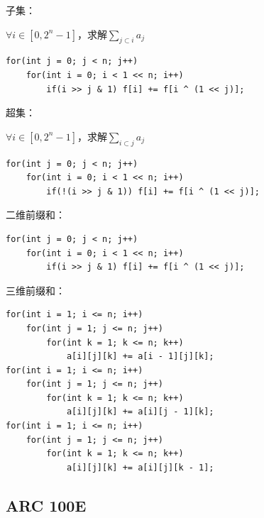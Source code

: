 子集：\par
$\forall i \in [0, 2^n - 1]$，求解$\sum\limits_{j \subset i} a_j$\par
\begin{lstlisting}
for(int j = 0; j < n; j++) 
    for(int i = 0; i < 1 << n; i++)
        if(i >> j & 1) f[i] += f[i ^ (1 << j)];
\end{lstlisting} \par

超集：\par
$\forall i \in [0, 2^n - 1]$，求解$\sum\limits_{i \subset j} a_j$\par
\begin{lstlisting}
for(int j = 0; j < n; j++) 
    for(int i = 0; i < 1 << n; i++)
        if(!(i >> j & 1)) f[i] += f[i ^ (1 << j)];
\end{lstlisting}

二维前缀和：\par
\begin{lstlisting}
for(int j = 0; j < n; j++) 
    for(int i = 0; i < 1 << n; i++)
        if(i >> j & 1) f[i] += f[i ^ (1 << j)];
\end{lstlisting} \par

三维前缀和：\par
\begin{lstlisting}
for(int i = 1; i <= n; i++)
    for(int j = 1; j <= n; j++)
        for(int k = 1; k <= n; k++) 
            a[i][j][k] += a[i - 1][j][k];
for(int i = 1; i <= n; i++)
    for(int j = 1; j <= n; j++)
        for(int k = 1; k <= n; k++)
            a[i][j][k] += a[i][j - 1][k];
for(int i = 1; i <= n; i++)
    for(int j = 1; j <= n; j++)
        for(int k = 1; k <= n; k++)
            a[i][j][k] += a[i][j][k - 1];
\end{lstlisting} \par

\subsection{ARC 100E}


